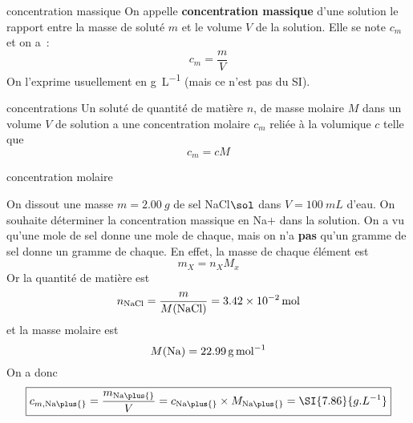 \documentclass[../main/main.tex]{subfiles}
\begin{document}
\begin{tcbraster}[raster columns=2, raster equal height=rows]
    \begin{tcolorbox}[blankest, raster multicolumn=1]
        \begin{tcbraster}[raster columns=1]
            \begin{defi}[label=def:cmol]{concentration massique}
                On appelle \textbf{concentration massique} d'une solution le
                rapport entre la masse de soluté $m$ et le volume $V$ de
                la solution. Elle se note $c_m$ et on a~:
                \[c_m = \frac{m}{V}\]
                On l'exprime usuellement en \si{g.L^{-1}} (mais ce n'est pas du SI).
            \end{defi}
            \begin{prop}[label=prop:cvolmol]{concentrations}
                Un soluté de quantité de matière $n$, de masse molaire $M$ dans
                un volume $V$ de solution a une concentration molaire $c_m$
                reliée à la volumique $c$ telle que
                \[ \boxed{c_m = cM}\]
            \end{prop}
        \end{tcbraster}
    \end{tcolorbox}
    \begin{exem}[label=exem:cmol]{concentration molaire}

        On dissout une masse $m = \SI{2.00}{g}$ de sel NaCl$\sol$ dans $V =
        \SI{100}{mL}$ d'eau. On souhaite déterminer la concentration massique en
        Na$\plus{}$ dans la solution. On a vu qu'une mole de sel
        donne une mole de chaque, mais on n'a \textbf{pas} qu'un gramme de sel donne un
        gramme de chaque. En effet, la masse de chaque élément est
        \[m_X = n_XM_x\]
        Or la quantité de matière est
        \[n_{\rm NaCl} = \frac{m}{M({\rm NaCl})} = \SI{3.42e-2}{mol}\]
        et la masse molaire est
        \[M({\rm Na}) = \SI{22.99}{g.mol^{-1}}\]
        On a donc
        \begin{equation*}
            \boxed{ c_{m,\rm Na\plus{}} = \frac{m_{\rm Na\plus{}}}{V} =
            c_{\rm Na\plus{}}\times M_{\rm Na\plus{}} = 
            \SI{7.86}{g.L^{-1}}}
        \end{equation*}
    \end{exem}
\end{tcbraster}
\end{document}
